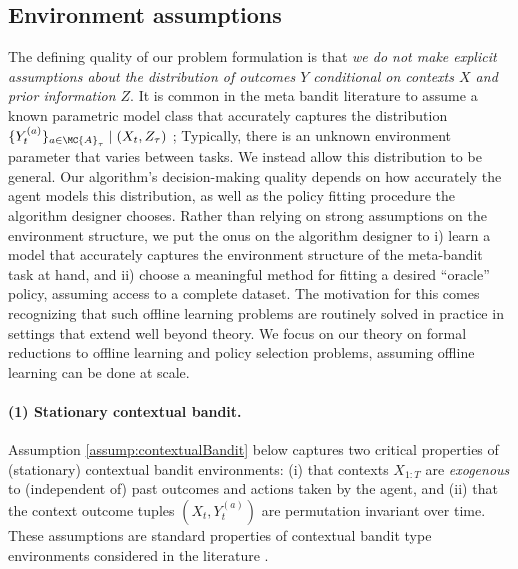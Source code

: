 \subsection{Environment assumptions}
The defining quality of our problem formulation is that \textit{we do not make explicit assumptions about the distribution of outcomes $Y$ conditional on contexts $X$ and prior information $Z$}. It is common in the meta bandit literature to assume a known parametric model class that accurately captures the distribution $\{ Y_t^{(a)} \}_{a \in \MC{A}_{\tau}} \mid (X_t, Z_{\tau})$ \citep{kveton2021meta,wan2021metadata,cella2020meta,cella2022meta}; Typically, there is an unknown environment parameter that varies between tasks.
We instead allow this distribution to be general. Our algorithm's decision-making quality depends on how accurately the agent models this distribution, as well as the policy fitting procedure the algorithm designer chooses. Rather than relying on strong assumptions on the environment structure, we put the onus on the algorithm designer to i) learn a model that accurately captures the environment structure of the meta-bandit task at hand, and ii) choose a meaningful method for fitting a desired ``oracle'' policy, assuming access to a complete dataset. The motivation for this comes recognizing that such offline learning problems are routinely solved in practice in settings that extend well beyond theory. We focus on our theory on formal reductions to offline learning and policy selection problems, assuming offline learning can be done at scale.

\paragraph{(1) Stationary contextual bandit.} Assumption \ref{assump:contextualBandit} below captures two critical properties of (stationary) contextual bandit environments: 
(i) that contexts $X_{1:T}$ are \textit{exogenous} to (independent of) past outcomes and actions taken by the agent,
and (ii) that the context outcome tuples $(X_t, Y_t^{(a)})$ are permutation invariant over time. These assumptions are standard properties of contextual bandit type environments considered in the literature \citep{LattimoreSz19}.

